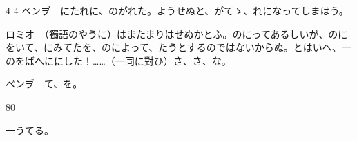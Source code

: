 \documentclass[tate,paper=b6j,jafontsize=9pt]{jlreq}
\begin{document}
\begin{azconvIndented}{4\zw}{-4\zw}
ベンヺ　にたれに、のがれた。ようせぬと、がてゝ、れになってしまはう。

ロミオ　（獨語のやうに）はまたまりはせぬかとふ。のにってあるしいが、のにをいて、にみてたを、のによって、たうとするのではないからぬ。とはいへ、一のをばへににした！……（一同に對ひ）さ、さ、な。

ベンヺ　て、を。

\end{azconvIndented}
\begin{azconvIndented}{8\zw}{0\zw}

一うてる。

\end{azconvIndented}

\end{document}
